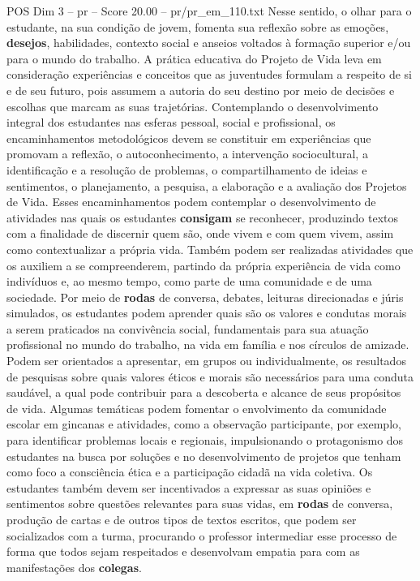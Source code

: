 \begin{textsample}{POS Dim 3 – pr – Score 20.00 – pr/pr\_em\_110.txt}
Nesse sentido, o olhar para o estudante, na sua condição de jovem, fomenta sua reflexão sobre as emoções, \textbf{desejos}, habilidades, contexto social e anseios voltados à formação superior e/ou para o mundo do trabalho.
A prática educativa do Projeto de Vida leva em consideração experiências e conceitos que as juventudes formulam a respeito de si e de seu futuro, pois assumem a autoria do seu destino por meio de decisões e escolhas que marcam as suas trajetórias.
Contemplando o desenvolvimento integral dos estudantes nas esferas pessoal, social e profissional, os encaminhamentos metodológicos devem se constituir em experiências que promovam a reflexão, o autoconhecimento, a intervenção sociocultural, a identificação e a resolução de problemas, o compartilhamento de ideias e sentimentos, o planejamento, a pesquisa, a elaboração e a avaliação dos Projetos de Vida.
Esses encaminhamentos podem contemplar o desenvolvimento de atividades nas quais os estudantes \textbf{consigam} se reconhecer, produzindo textos com a finalidade de discernir quem são, onde vivem e com quem vivem, assim como contextualizar a própria vida.
Também podem ser realizadas atividades que os auxiliem a se compreenderem, partindo da própria experiência de vida como indivíduos e, ao mesmo tempo, como parte de uma comunidade e de uma sociedade.
Por meio de \textbf{rodas} de conversa, debates, leituras direcionadas e júris simulados, os estudantes podem aprender quais são os valores e condutas morais a serem praticados na convivência social, fundamentais para sua atuação profissional no mundo do trabalho, na vida em família e nos círculos de amizade.
Podem ser orientados a apresentar, em grupos ou individualmente, os resultados de pesquisas sobre quais valores éticos e morais são necessários para uma conduta saudável, a qual pode contribuir para a descoberta e alcance de seus propósitos de vida.
Algumas temáticas podem fomentar o envolvimento da comunidade escolar em gincanas e atividades, como a observação participante, por exemplo, para identificar problemas locais e regionais, impulsionando o protagonismo dos estudantes na busca por soluções e no desenvolvimento de projetos que tenham como foco a consciência ética e a participação cidadã na vida coletiva.
Os estudantes também devem ser incentivados a expressar as suas opiniões e sentimentos sobre questões relevantes para suas vidas, em \textbf{rodas} de conversa, produção de cartas e de outros tipos de textos escritos, que podem ser socializados com a turma, procurando o professor intermediar esse processo de forma que todos sejam respeitados e desenvolvam empatia para com as manifestações dos \textbf{colegas}.

\end{textsample}
